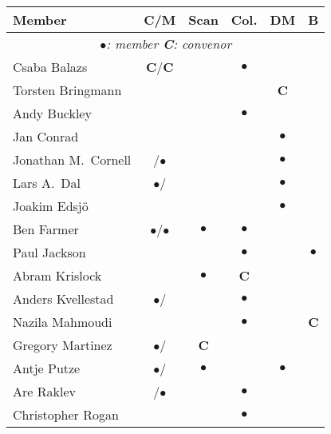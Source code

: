 \newcommand{\C}{\textbf{C}}            %
\newcommand{\M}{$\bullet$}             %
\newlength{\Mwidth} \settowidth{\Mwidth}{\M}
\newcommand{\E}{\makebox[\Mwidth]{}}   %
\begin{center}
\renewcommand{\arraystretch}{1.25}
\begin{tabular*}{0.99\textwidth}{@{\extracolsep{\fill}}|lccccc|}
  \hline
  \textbf{Member} & \textbf{C/M}  & \textbf{Scan}
                  & \textbf{Col.} & \textbf{DM}
                  & \textbf{B} \\
  \hline
  \multicolumn{6}{|c|}{\textit{\M{}: member \hspace{3em} \C{}: convenor}}\\
  Csaba Balazs          & \C/\C &    & \M &    &    \\
  Torsten Bringmann     &       &    &    & \C &    \\
  Andy Buckley          &       &    & \M &    &    \\
  Jan Conrad            &       &    &    & \M &    \\
  Jonathan M.\ Cornell  & \E/\M &    &    & \M &    \\
  Lars A.\ Dal          & \M/\E &    &    & \M &    \\
  Joakim Edsj\"o        &       &    &    & \M &    \\
  Ben Farmer            & \M/\M & \M & \M &    &    \\
  Paul Jackson          &       &    & \M &    & \M \\
  Abram Krislock        &       & \M & \C &    &    \\
  Anders Kvellestad     & \M/\E &    & \M &    &    \\
  Nazila Mahmoudi       &       &    & \M &    & \C \\
  Gregory Martinez      & \M/\E & \C &    &    &    \\
  Antje Putze           & \M/\E & \M &    & \M &    \\
  Are Raklev            & \E/\M &    & \M &    &    \\
  Christopher Rogan     &       &    & \M &    &    \\

\end{tabular*}
\end{center}

